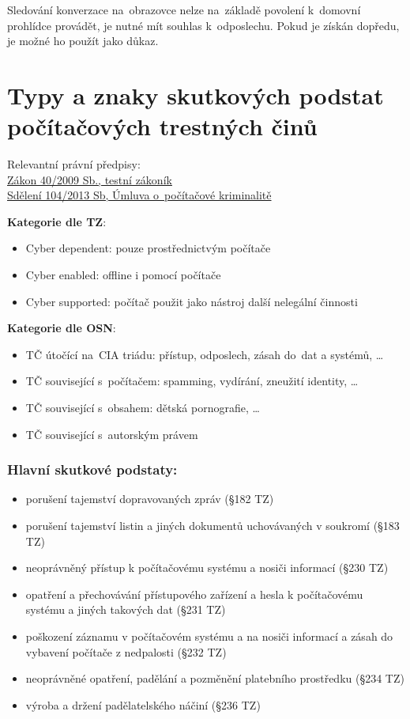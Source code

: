 Sledování konverzace na~obrazovce nelze na~základě povolení k~domovní prohlídce provádět, je nutné mít souhlas k~odposlechu.
Pokud je získán dopředu, je možné ho použít jako důkaz.


\clearpage
\section{Typy a znaky skutkových podstat počítačových trestných činů}

{}Relevantní právní předpisy:
\\\href{https://www.zakonyprolidi.cz/cs/2009-40}{Zákon 40/2009 Sb., testní zákoník}
\\\href{https://www.zakonyprolidi.cz/ms/2013-104}{Sdělení 104/2013 Sb, Úmluva o~počítačové kriminalitě}

\textbf{Kategorie dle TZ}:
\begin{itemize}
\item Cyber dependent: pouze prostřednictvým počítače
\item Cyber enabled: offline i pomocí počítače
\item Cyber supported: počítač použit jako nástroj další nelegální činnosti
\end{itemize}

\textbf{Kategorie dle OSN}:
\begin{itemize}
\item TČ útočící na~CIA triádu: přístup, odposlech, zásah do~dat a systémů, \dots
\item TČ související s~počítačem: spamming, vydírání, zneužití identity, \dots
\item TČ související s~obsahem: dětská pornografie, \dots
\item TČ související s~autorským právem
\end{itemize}


\subsubsection{Hlavní skutkové podstaty:}
\begin{itemize}
    \item porušení tajemství dopravovaných zpráv (§182 TZ)
    \item porušení tajemství listin a jiných dokumentů uchovávaných v soukromí (§183 TZ)
    \item neoprávněný přístup k počítačovému systému a nosiči informací (§230 TZ)
    \item opatření a přechovávání přístupového zařízení a hesla k počítačovému systému a jiných takových dat (§231 TZ)
    \item poškození záznamu v počítačovém systému a na nosiči informací a zásah do vybavení počítače z nedpalosti (§232 TZ)
    \item neoprávněné opatření, padělání a pozměnění platebního prostředku (§234 TZ)
    \item výroba a držení padělatelského náčiní (§236 TZ)
\end{itemize}


